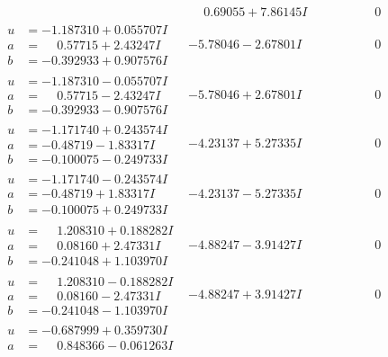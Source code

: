 \documentclass[1p]{elsarticle_modified}
\theoremstyle{definition}
\begin{document}
$$\begin{array}{c|c|c}
 & \phantom{-}0.69055 + 7.86145 I & \phantom{-0.000000 } 0 \\ \hline\begin{aligned}
u &= -1.187310 + 0.055707 I \\
a &= \phantom{-}0.57715 + 2.43247 I \\
b &= -0.392933 + 0.907576 I\end{aligned}
 & -5.78046 - 2.67801 I & \phantom{-0.000000 } 0 \\ \hline\begin{aligned}
u &= -1.187310 - 0.055707 I \\
a &= \phantom{-}0.57715 - 2.43247 I \\
b &= -0.392933 - 0.907576 I\end{aligned}
 & -5.78046 + 2.67801 I & \phantom{-0.000000 } 0 \\ \hline\begin{aligned}
u &= -1.171740 + 0.243574 I \\
a &= -0.48719 - 1.83317 I \\
b &= -0.100075 - 0.249733 I\end{aligned}
 & -4.23137 + 5.27335 I & \phantom{-0.000000 } 0 \\ \hline\begin{aligned}
u &= -1.171740 - 0.243574 I \\
a &= -0.48719 + 1.83317 I \\
b &= -0.100075 + 0.249733 I\end{aligned}
 & -4.23137 - 5.27335 I & \phantom{-0.000000 } 0 \\ \hline\begin{aligned}
u &= \phantom{-}1.208310 + 0.188282 I \\
a &= \phantom{-}0.08160 + 2.47331 I \\
b &= -0.241048 + 1.103970 I\end{aligned}
 & -4.88247 - 3.91427 I & \phantom{-0.000000 } 0 \\ \hline\begin{aligned}
u &= \phantom{-}1.208310 - 0.188282 I \\
a &= \phantom{-}0.08160 - 2.47331 I \\
b &= -0.241048 - 1.103970 I\end{aligned}
 & -4.88247 + 3.91427 I & \phantom{-0.000000 } 0 \\ \hline\begin{aligned}
u &= -0.687999 + 0.359730 I \\
a &= \phantom{-}0.848366 - 0.061263 I \\

\end{aligned}
\end{array}$$
\end{document}
